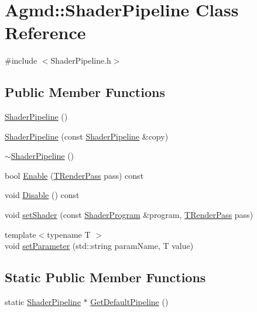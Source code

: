 \hypertarget{class_agmd_1_1_shader_pipeline}{\section{Agmd\+:\+:Shader\+Pipeline Class Reference}
\label{class_agmd_1_1_shader_pipeline}
}


{\ttfamily \#include $<$Shader\+Pipeline.\+h$>$}

\subsection*{Public Member Functions}
\begin{DoxyCompactItemize}
\item 
\hyperlink{class_agmd_1_1_shader_pipeline_ab388d2067cb1e507ec189a9a60a854ff}{Shader\+Pipeline} ()
\item 
\hyperlink{class_agmd_1_1_shader_pipeline_ac8da48c29456da4a1c24634340b86088}{Shader\+Pipeline} (const \hyperlink{class_agmd_1_1_shader_pipeline}{Shader\+Pipeline} \&copy)
\item 
\hyperlink{class_agmd_1_1_shader_pipeline_acd4bb1d22b20bfa4312244b598d946c9}{$\sim$\+Shader\+Pipeline} ()
\item 
bool \hyperlink{class_agmd_1_1_shader_pipeline_a9b2a82ed06dcc68878826d55bfc859c7}{Enable} (\hyperlink{namespace_agmd_a893087981df53d0bf39466e9039aeb73}{T\+Render\+Pass} pass) const 
\item 
void \hyperlink{class_agmd_1_1_shader_pipeline_ad94ea7b2808638aadfa27eefeea89fa6}{Disable} () const 
\item 
void \hyperlink{class_agmd_1_1_shader_pipeline_a6516c698816def7da90a4a68bf3e988a}{set\+Shader} (const \hyperlink{class_agmd_1_1_shader_program}{Shader\+Program} \&program, \hyperlink{namespace_agmd_a893087981df53d0bf39466e9039aeb73}{T\+Render\+Pass} pass)
\item 
{\footnotesize template$<$typename T $>$ }\\void \hyperlink{class_agmd_1_1_shader_pipeline_adedd51bc92b36559717a69ff9f67ea2a}{set\+Parameter} (std\+::string param\+Name, T value)
\end{DoxyCompactItemize}
\subsection*{Static Public Member Functions}
\begin{DoxyCompactItemize}
\item 
static \hyperlink{class_agmd_1_1_shader_pipeline}{Shader\+Pipeline} $\ast$ \hyperlink{class_agmd_1_1_shader_pipeline_a210938546d74ae019cad424d6315bd3d}{Get\+Default\+Pipeline} ()
\end{DoxyCompactItemize}


